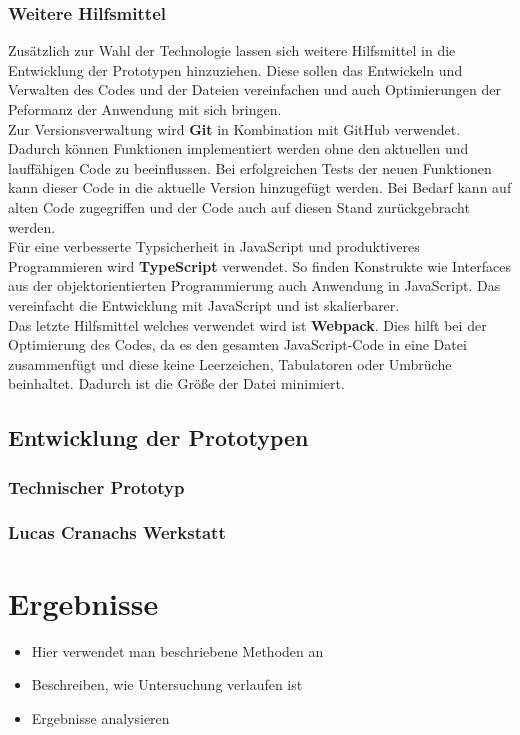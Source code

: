\documentclass[a4paper,12pt,oneside]{article}
\begin{document}
      \subsubsection{Weitere Hilfsmittel}
        Zusätzlich zur Wahl der Technologie lassen sich weitere Hilfsmittel
        in die Entwicklung der Prototypen hinzuziehen. Diese sollen das
        Entwickeln und Verwalten des Codes und der Dateien vereinfachen und
        auch Optimierungen der Peformanz der Anwendung mit sich
        bringen. \\
        Zur Versionsverwaltung wird \textbf{Git} in Kombination mit GitHub
        verwendet. Dadurch können Funktionen implementiert werden ohne den
        aktuellen und lauffähigen Code zu beeinflussen. Bei erfolgreichen
        Tests der neuen Funktionen kann dieser Code in die aktuelle Version
        hinzugefügt werden. Bei Bedarf kann auf alten Code zugegriffen und
        der Code auch auf diesen Stand zurückgebracht werden. \\
        Für eine verbesserte Typsicherheit in JavaScript und produktiveres
        Programmieren wird \textbf{TypeScript} verwendet. So finden Konstrukte
        wie Interfaces aus der objektorientierten Programmierung auch
        Anwendung in JavaScript. Das vereinfacht die Entwicklung mit JavaScript
        und ist skalierbarer. \\
        Das letzte Hilfsmittel welches verwendet wird ist \textbf{Webpack}. Dies
        hilft bei der Optimierung des Codes, da es den gesamten JavaScript-Code
        in eine Datei zusammenfügt und diese keine Leerzeichen, Tabulatoren
        oder Umbrüche beinhaltet. Dadurch ist die Größe der Datei minimiert.
    \subsection{Entwicklung der Prototypen}
      \subsubsection{Technischer Prototyp}
      \subsubsection{Lucas Cranachs Werkstatt}
  \section{Ergebnisse}
    \begin{itemize}
      \item Hier verwendet man beschriebene Methoden an
      \item Beschreiben, wie Untersuchung verlaufen ist
      \item Ergebnisse analysieren
    \end{itemize}
\end{document}
